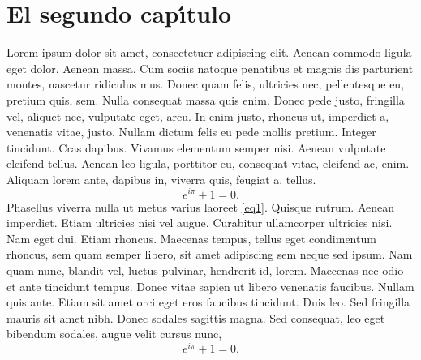 \documentclass[a4paper,11pt,spanish, twoside, leqno]{tfg-uam}
\theoremstyle{definition}
\begin{document}
\chapter{El segundo cap\'{\i}tulo}\label{chap2}

Lorem ipsum dolor sit amet, consectetuer adipiscing elit. Aenean commodo ligula eget dolor. Aenean massa. Cum sociis natoque penatibus et magnis dis parturient montes, nascetur ridiculus mus. Donec quam felis, ultricies nec, pellentesque eu, pretium quis, sem. Nulla consequat massa quis enim. Donec pede justo, fringilla vel, aliquet nec, vulputate eget, arcu. In enim justo, rhoncus ut, imperdiet a, venenatis vitae, justo. Nullam dictum felis eu pede mollis pretium. Integer tincidunt. Cras dapibus. Vivamus elementum semper nisi. Aenean vulputate eleifend tellus. Aenean leo ligula, porttitor eu, consequat vitae, eleifend ac, enim. Aliquam lorem ante, dapibus in, viverra quis, feugiat a, tellus.
\begin{equation}\label{eq8}
e^{i\pi }+1=0.
\end{equation}
Phasellus viverra nulla ut metus varius laoreet \eqref{eq1}. Quisque rutrum. Aenean imperdiet. Etiam ultricies nisi vel augue. Curabitur ullamcorper ultricies nisi. Nam eget dui. Etiam rhoncus. Maecenas tempus, tellus eget condimentum rhoncus, sem quam semper libero, sit amet adipiscing sem neque sed ipsum. Nam quam nunc, blandit vel, luctus pulvinar, hendrerit id, lorem. Maecenas nec odio et ante tincidunt tempus. Donec vitae sapien ut libero venenatis faucibus. Nullam quis ante. Etiam sit amet orci eget eros faucibus tincidunt. Duis leo. Sed fringilla mauris sit amet nibh. Donec sodales sagittis magna. Sed consequat, leo eget bibendum sodales, augue velit cursus nunc,
$$
e^{i\pi }+1=0.
$$
\end{document}
